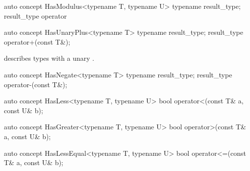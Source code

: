 \documentclass[american,twoside]{book}
\begin{document}
\begin{itemdecl}
auto concept HasModulus<typename T, typename U> {
  typename result_type;
  result_type operator%
}
\end{itemdecl}

\begin{itemdescr}
\pnum
{}
\end{itemdescr}

\begin{itemdecl}
auto concept HasUnaryPlus<typename T> {
  typename result_type;
  result_type operator+(const T&);
}
\end{itemdecl}

\begin{itemdescr}
\pnum
\mbox{\reallynote} describes types with a unary \mbox{}.
\end{itemdescr}

\begin{itemdecl}
auto concept HasNegate<typename T> {
  typename result_type;
  result_type operator-(const T&);
}
\end{itemdecl}

\begin{itemdescr}
\pnum
{}
\end{itemdescr}

\begin{itemdecl}
auto concept HasLess<typename T, typename U> {
  bool operator<(const T& a, const U& b);
}
\end{itemdecl}

\begin{itemdescr}
\pnum
{}
\end{itemdescr}

\begin{itemdecl}
auto concept HasGreater<typename T, typename U> {
  bool operator>(const T& a, const U& b);
}
\end{itemdecl}

\begin{itemdescr}
\pnum
{}
\end{itemdescr}

\begin{itemdecl}
auto concept HasLessEqual<typename T, typename U> {
  bool operator<=(const T& a, const U& b);
}
\end{itemdecl}
\end{document}
